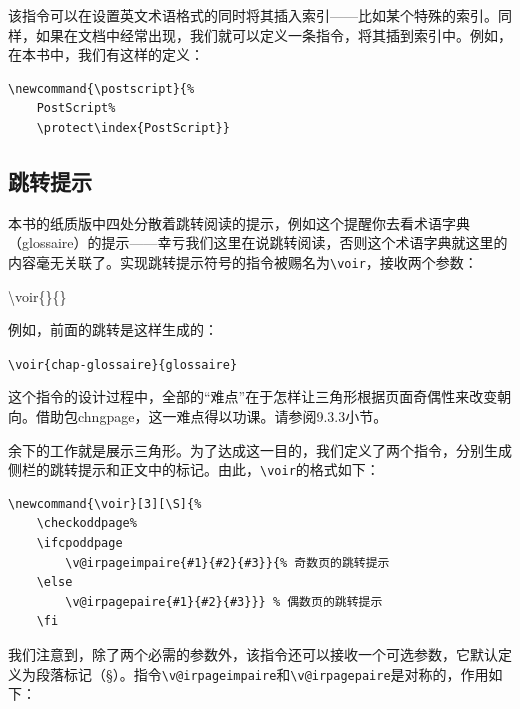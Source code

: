 该指令可以在设置英文术语格式的同时将其插入索引——比如某个特殊的索引。同样，如果在文档中经常出现，我们就可以定义一条指令，将其插到索引中。例如，在本书中，我们有这样的定义：

\begin{dmd}
\begin{verbatim}
\newcommand{\postscript}{% 
    PostScript% 
    \protect\index{PostScript}}
\end{verbatim}
\end{dmd}

\subsection{跳转提示}

本书的纸质版中四处分散着跳转阅读的提示，例如这个提醒你去看术语字典（glossaire）的提示——幸亏我们这里在说跳转阅读，否则这个术语字典就这里的内容毫无关联了。实现跳转提示符号的指令被赐名为\verb|\voir|，接收两个参数：

\begin{dmd}
\backslash voir\{\}\{\}
\end{dmd}

例如，前面的跳转是这样生成的：

\begin{dmd}
\verb|\voir{chap-glossaire}{glossaire}|
\end{dmd}

这个指令的设计过程中，全部的“难点”在于怎样让三角形根据页面奇偶性来改变朝向。借助包\textsf{chngpage}，这一难点得以功课。请参阅9.3.3小节。

余下的工作就是展示三角形。为了达成这一目的，我们定义了两个指令，分别生成侧栏的跳转提示和正文中的标记。由此，\verb|\voir|的格式如下：

\begin{dmd}
\begin{verbatim}
\newcommand{\voir}[3][\S]{% 
    \checkoddpage% 
    \ifcpoddpage
        \v@irpageimpaire{#1}{#2}{#3}}{% 奇数页的跳转提示
    \else
        \v@irpagepaire{#1}{#2}{#3}}} % 偶数页的跳转提示
    \fi
\end{verbatim}
\end{dmd}%

我们注意到，除了两个必需的参数外，该指令还可以接收一个可选参数，它默认定义为段落标记（\S）。指令\verb|\v@irpageimpaire|和\verb|\v@irpagepaire|是对称的，作用如下：

